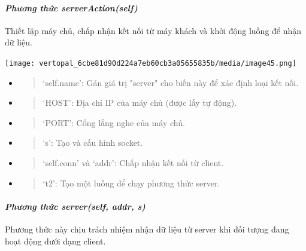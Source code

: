 \documentclass[a4paper]{article}
\begin{document}
\hypertarget{phux1b0ux1a1ng-thux1ee9c-serveractionself}{%
\paragraph{\texorpdfstring{\emph{Phương thức
serverAction(self)}}{Phương thức serverAction(self)}}\label{phux1b0ux1a1ng-thux1ee9c-serveractionself}}

Thiết lập máy chủ, chấp nhận kết nối từ máy khách và khởi động luồng để
nhận dữ liệu.

\texttt{[image: vertopal\_6cbe81d90d224a7eb60cb3a05655835b/media/image45.png]}

\begin{itemize}
\item
  \begin{quote}
  `self.name': Gán giá trị "server" cho biến này để xác định loại kết
  nối.
  \end{quote}
\item
  \begin{quote}
  `HOST': Địa chỉ IP của máy chủ (được lấy tự động).
  \end{quote}
\item
  \begin{quote}
  `PORT': Cổng lắng nghe của máy chủ.
  \end{quote}
\item
  \begin{quote}
  `s': Tạo và cấu hình socket.
  \end{quote}
\item
  \begin{quote}
  `self.conn' và `addr': Chấp nhận kết nối từ client.
  \end{quote}
\item
  \begin{quote}
  `t2': Tạo một luồng để chạy phương thức server.
  \end{quote}
\end{itemize}

\hypertarget{phux1b0ux1a1ng-thux1ee9c-serverself-addr-s}{%
\paragraph{\texorpdfstring{\emph{Phương thức server(self, addr,
s)}}{Phương thức server(self, addr, s)}}\label{phux1b0ux1a1ng-thux1ee9c-serverself-addr-s}}

Phương thức này chịu trách nhiệm nhận dữ liệu từ server khi đối tượng
đang hoạt động dưới dạng client.
\end{document}
